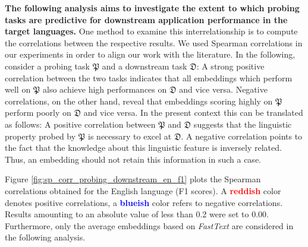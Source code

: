 \textbf{The following analysis aims to investigate the extent to which probing tasks are predictive for downstream application performance in the target languages.} One method to examine this interrelationship is to compute the correlations between the respective results. We used Spearman correlations in our experiments in order to align our work with the literature. In the following, consider a probing task $\mathfrak{P}$ and a downstream task $\mathfrak{D}$: A strong positive correlation between the two tasks indicates that all embeddings which perform well on $\mathfrak{P}$ also achieve high performances on $\mathfrak{D}$ and vice versa. Negative correlations, on the other hand, reveal that embeddings scoring highly on $\mathfrak{P}$ perform poorly on $\mathfrak{D}$ and vice versa. In the present context  this can be translated as follows: A positive correlation between $\mathfrak{P}$ and $\mathfrak{D}$ suggests that the linguistic property probed by $\mathfrak{P}$ is necessary to excel at $\mathfrak{D}$. A negative correlation points to the fact that the knowledge about this linguistic feature is inversely related. Thus, an embedding should not retain this information in such a case.

 Figure \vref{fig:sp_corr_probing_downstream_en_f1} plots the Spearman correlations obtained for the English language (F1 scores). A \textcolor{red}{\textbf{reddish}} color denotes positive correlations, a \textcolor{blue}{\textbf{blueish}} color refers to negative correlations. Results amounting to an absolute value of less than 0.2 were set to 0.00. Furthermore, only the average embeddings based on \textit{FastText} are considered in the following analysis.

